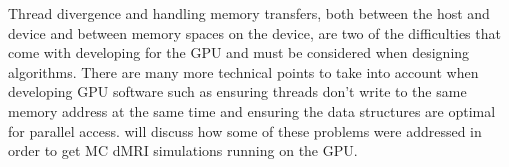 Thread divergence and handling memory transfers, both between the host and device and between memory spaces on the device, are two of the difficulties that come with developing for the \ac{GPU} and must be considered when designing algorithms.  
There are many more technical points to take into account when developing \ac{GPU} software such as ensuring threads don't write to the same memory address at the same time and ensuring the data structures are optimal for parallel access.
 will discuss how some of these problems were addressed in order to get \ac{MC} \ac{dMRI} simulations running on the \ac{GPU}. 



